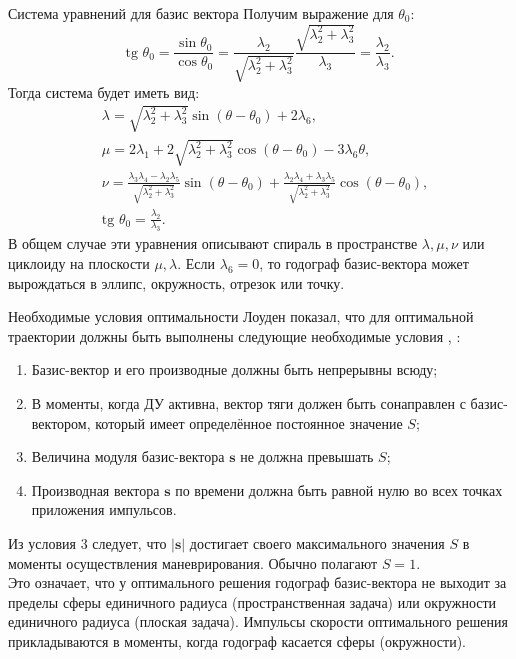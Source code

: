 \documentclass[9pt]{beamer}
\begin{document}
\begin{frame}{Система уравнений для базис вектора}
Получим выражение для $\theta_0$:
\begin{equation*}
    \text{tg } \theta_0 = \frac{\sin \theta_0}{\cos \theta_0} = \frac{\lambda_2}{\sqrt{\lambda_2^2 + \lambda_3^2}} \frac{\sqrt{\lambda_2^2 + \lambda_3^2}}{\lambda_3} = \frac{\lambda_2}{\lambda_3}.
\end{equation*}
Тогда система будет иметь вид:
\begin{equation*}
    \boxed{
    \begin{aligned}
        &\lambda = \sqrt{\lambda_2^2 + \lambda_3^2} \sin (\theta - \theta_0) + 2 \lambda_6, \\
        &\mu = 2 \lambda_1 + 2 \sqrt{\lambda_2^2 + \lambda_3^2} \cos (\theta - \theta_0) - 3 \lambda_6 \theta, \\
        &\nu = \frac{\lambda_3 \lambda_4 - \lambda_2 \lambda_5}{\sqrt{\lambda_2^2 + \lambda_3^2}} \sin (\theta - \theta_0) + \frac{\lambda_2 \lambda_4 + \lambda_3 \lambda_5}{\sqrt{\lambda_2^2 + \lambda_3^2}} \cos (\theta - \theta_0), \\
        &\text{tg } \theta_0 = \frac{\lambda_2}{\lambda_3}. 
    \end{aligned}
    }
\end{equation*}
В общем случае эти уравнения описывают спираль в пространстве $\lambda, \mu, \nu$ или циклоиду на плоскости $\mu, \lambda$. Если $\lambda_6 = 0$, то годограф базис-вектора может вырождаться в эллипс, окружность, отрезок или точку. 
\end{frame}

\begin{frame}{Необходимые условия оптимальности}
Лоуден показал, что для оптимальной траектории должны быть выполнены следующие необходимые условия \cite{Lawden_all}, \cite{Edelbaum_1}:
\begin{enumerate}
    \item Базис-вектор и его производные должны быть непрерывны всюду;
    \item В моменты, когда ДУ активна, вектор тяги должен быть сонаправлен с базис-вектором, который имеет определённое постоянное значение $S$;
    \item Величина модуля базис-вектора $\mathbf{s}$ не должна превышать $S$;
    \item Производная вектора $\mathbf{s}$ по времени должна быть равной нулю во всех точках приложения импульсов.
\end{enumerate}
Из условия 3 следует, что $|\mathbf{s}|$ достигает своего максимального значения $S$ в моменты осуществления маневрирования. Обычно полагают $S = 1$. \\
Это означает, что у оптимального решения годограф базис-вектора не выходит за пределы сферы единичного радиуса (пространственная задача) или окружности единичного радиуса (плоская задача). Импульсы скорости оптимального решения прикладываются в моменты, когда годограф касается сферы (окружности).
\end{frame}
\end{document}
